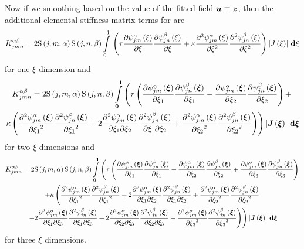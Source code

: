 Now if we smoothing based on the value of the fitted field \ie
$\boldsymbol{u}\equiv\boldsymbol{z}$, then the additional elemental stiffness matrix
terms for  are
\begin{equation}
  K^{\alpha\beta}_{jmn}=2   \mathrm{S} \left( j,m,\alpha \right)     \mathrm{S} \left( j,n,\beta \right)  
    \displaystyle\int\limits_{0}^{1} \,\left( \tau \dfrac{\partial    \psi_{jm}^{\alpha} \left( \xi \right)  }{\partial \xi}  \dfrac{\partial    \psi_{jn}^{\beta} \left( \xi \right)  }{\partial \xi} +
      \kappa \dfrac{\partial^{2}    \psi_{jm}^{\alpha} \left( \xi \right)  }{\partial {\xi}^{2}} 
       \dfrac{\partial^{2}    \psi_{jn}^{\beta} \left( \xi \right)  }{\partial {\xi}^{2}}  \right)\left|  J\left( \xi \right)  \right|\, \boldsymbol{\mathrm{d}} \xi 
\end{equation}
for one $\xi$ dimension and 
\begin{multline}
  K^{\alpha\beta}_{jmn}=2\idxgsf{j}{m}{\alpha}\idxgsf{j}{n}{\beta}
  \dintl{\vect{0}}{\vect{1}}\left(\tau\pbrac{\delby{\idxgbfn{j}{m}{\alpha}{\vectr{\xi}}}{\xione}
      \delby{\idxgbfn{j}{n}{\beta}{\vectr{\xi}}}{\xione}+
      \delby{\idxgbfn{j}{m}{\alpha}{\vectr{\xi}}}{\xitwo}
      \delby{\idxgbfn{j}{n}{\beta}{\vectr{\xi}}}{\xitwo}}+\right. \\
  \left.\kappa\pbrac{\deltwosqby{\idxgbfn{j}{m}{\alpha}{\vectr{\xi}}}{\xione}
      \deltwosqby{\idxgbfn{j}{n}{\beta}{\vectr{\xi}}}{\xione}
      +2\deltwoby{\idxgbfn{j}{m}{\alpha}{\vectr{\xi}}}{\xione}{\xitwo}
      \deltwoby{\idxgbfn{j}{n}{\beta}{\vectr{\xi}}}{\xione}{\xitwo}
      +\deltwosqby{\idxgbfn{j}{m}{\alpha}{\vectr{\xi}}}{\xitwo}
      \deltwosqby{\idxgbfn{j}{n}{\beta}{\vectr{\xi}}}{\xitwo}}\right)
  \abs{\fnof{\matr{J}}{\vectr{\xi}}}\,\exteriorderivop\vect{\xi}
\end{multline}
for two $\xi$ dimensions and
\begin{multline}
  K^{\alpha\beta}_{jmn}=2\idxgsf{j}{m}{\alpha}\idxgsf{j}{n}{\beta}
  \dintl{\vect{0}}{\vect{1}}\left(\tau\pbrac{\delby{\idxgbfn{j}{m}{\alpha}{\vectr{\xi}}}{\xione}
      \delby{\idxgbfn{j}{n}{\beta}{\vectr{\xi}}}{\xione}
      +\delby{\idxgbfn{j}{m}{\alpha}{\vectr{\xi}}}{\xitwo}
      \delby{\idxgbfn{j}{n}{\beta}{\vectr{\xi}}}{\xitwo}
      +\delby{\idxgbfn{j}{m}{\alpha}{\vectr{\xi}}}{\xithree}
      \delby{\idxgbfn{j}{n}{\beta}{\vectr{\xi}}}{\xithree}}\right. \\
  +\kappa\left(\deltwosqby{\idxgbfn{j}{m}{\alpha}{\vectr{\xi}}}{\xione}
      \deltwosqby{\idxgbfn{j}{n}{\beta}{\vectr{\xi}}}{\xione}+
      2\deltwoby{\idxgbfn{j}{m}{\alpha}{\vectr{\xi}}}{\xione}{\xitwo}
      \deltwoby{\idxgbfn{j}{n}{\beta}{\vectr{\xi}}}{\xione}{\xitwo}+
      \deltwosqby{\idxgbfn{j}{m}{\alpha}{\vectr{\xi}}}{\xitwo}
      \deltwosqby{\idxgbfn{j}{n}{\beta}{\vectr{\xi}}}{\xitwo}\right. \\
      \left.\left.+2\deltwoby{\idxgbfn{j}{m}{\alpha}{\vectr{\xi}}}{\xione}{\xithree}
      \deltwoby{\idxgbfn{j}{n}{\beta}{\vectr{\xi}}}{\xione}{\xithree}
       +2\deltwoby{\idxgbfn{j}{m}{\alpha}{\vectr{\xi}}}{\xitwo}{\xithree}
      \deltwoby{\idxgbfn{j}{n}{\beta}{\vectr{\xi}}}{\xitwo}{\xithree}
      +\deltwosqby{\idxgbfn{j}{m}{\alpha}{\vectr{\xi}}}{\xithree}
      \deltwosqby{\idxgbfn{j}{n}{\beta}{\vectr{\xi}}}{\xithree}\right)\right)
  \abs{\fnof{\matr{J}}{\vectr{\xi}}}\,\exteriorderivop\vect{\xi}
\end{multline}
for three $\xi$ dimensions.

